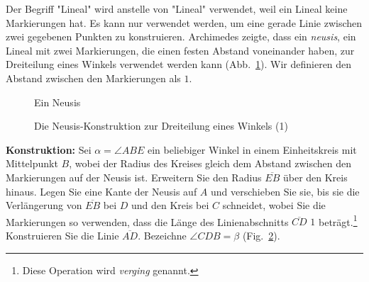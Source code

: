 Der Begriff "Lineal" wird anstelle von "Lineal" verwendet, weil ein Lineal keine Markierungen hat. Es kann nur verwendet werden, um eine gerade Linie zwischen zwei gegebenen Punkten zu konstruieren. Archimedes zeigte, dass ein \emph{neusis}, ein Lineal mit zwei Markierungen, die einen festen Abstand voneinander haben, zur Dreiteilung eines Winkels verwendet werden kann (Abb.~\ref{f.neusis}). Wir definieren den Abstand zwischen den Markierungen als $1$.

\begin{figure}[b]
\begin{center}
\end{center}
\caption{Ein Neusis}\label{f.neusis}
\end{figure}

\begin{figure}[t]
\begin{center}
\end{center}
\caption{Die Neusis-Konstruktion zur Dreiteilung eines Winkels (1)}\label{f.trisect-neusis-1}
\end{figure}

\noindent\textbf{Konstruktion:}
Sei $\alpha=\angle ABE$ ein beliebiger Winkel in einem Einheitskreis mit Mittelpunkt $B$, wobei der Radius des Kreises gleich dem Abstand zwischen den Markierungen auf der Neusis ist. Erweitern Sie den Radius $\overline{EB}$ über den Kreis hinaus. Legen Sie eine Kante der Neusis auf $A$ und verschieben Sie sie, bis sie die Verlängerung von $\overline{EB}$ bei $D$ und den Kreis bei $C$ schneidet, wobei Sie die Markierungen so verwenden, dass die Länge des Linienabschnitts $\overline{CD}$ $1$ beträgt.\footnote{Diese Operation wird \emph{verging} genannt.} Konstruieren Sie die Linie $\overline{AD}$. Bezeichne $\angle CDB=\beta$ (Fig.~\ref{f.trisect-neusis-1}).

